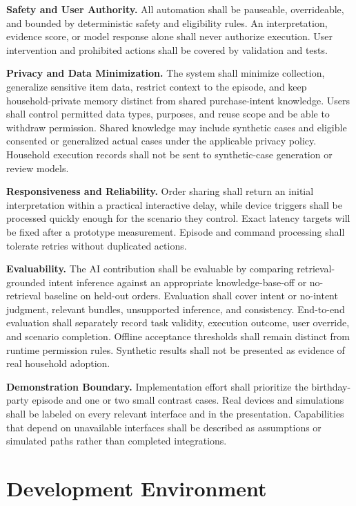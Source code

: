 \documentclass[conference]{IEEEtran}
\begin{document}
\textbf{Safety and User Authority.} All automation shall be pauseable, overrideable, and bounded by deterministic safety and eligibility rules. An interpretation, evidence score, or model response alone shall never authorize execution. User intervention and prohibited actions shall be covered by validation and tests.

\textbf{Privacy and Data Minimization.} The system shall minimize collection, generalize sensitive item data, restrict context to the episode, and keep household-private memory distinct from shared purchase-intent knowledge. Users shall control permitted data types, purposes, and reuse scope and be able to withdraw permission. Shared knowledge may include synthetic cases and eligible consented or generalized actual cases under the applicable privacy policy. Household execution records shall not be sent to synthetic-case generation or review models.

\textbf{Responsiveness and Reliability.} Order sharing shall return an initial interpretation within a practical interactive delay, while device triggers shall be processed quickly enough for the scenario they control. Exact latency targets will be fixed after a prototype measurement. Episode and command processing shall tolerate retries without duplicated actions.

\textbf{Evaluability.} The AI contribution shall be evaluable by comparing retrieval-grounded intent inference against an appropriate knowledge-base-off or no-retrieval baseline on held-out orders. Evaluation shall cover intent or no-intent judgment, relevant bundles, unsupported inference, and consistency. End-to-end evaluation shall separately record task validity, execution outcome, user override, and scenario completion. Offline acceptance thresholds shall remain distinct from runtime permission rules. Synthetic results shall not be presented as evidence of real household adoption.

\textbf{Demonstration Boundary.} Implementation effort shall prioritize the birthday-party episode and one or two small contrast cases. Real devices and simulations shall be labeled on every relevant interface and in the presentation. Capabilities that depend on unavailable interfaces shall be described as assumptions or simulated paths rather than completed integrations.

\section{Development Environment}
\end{document}
